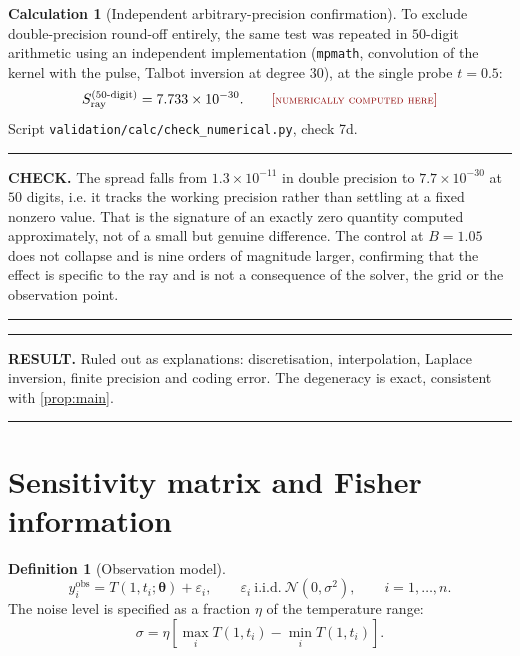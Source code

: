 \documentclass[11pt,a4paper]{article}
\theoremstyle{definition}
\newtheorem{definitionx}{Definition}[section]
\newtheorem{calculationx}{Calculation}[section]
\newenvironment{checkbox}%
  {\par\medskip\noindent\begin{minipage}{\linewidth}%
   \rule{\linewidth}{0.4pt}\par\noindent\textbf{CHECK.}\enspace}%
  {\par\rule{\linewidth}{0.4pt}\end{minipage}\par\medskip}
\newenvironment{resultbox}%
  {\par\medskip\noindent\begin{minipage}{\linewidth}%
   \rule{\linewidth}{1.0pt}\par\noindent\textbf{RESULT.}\enspace}%
  {\par\rule{\linewidth}{1.0pt}\end{minipage}\par\medskip}
\newcommand{\NUM}{\textcolor{red!55!black}{\footnotesize[\textsc{numerically computed here}]}}
\newcommand{\Bnum}{B}
\begin{document}
\begin{calculationx}[Independent arbitrary-precision confirmation]
\label{calc:degen-mp}
To exclude double-precision round-off entirely, the same test was repeated in
$50$-digit arithmetic using an independent implementation
(\texttt{mpmath}, convolution of the kernel with the pulse, Talbot inversion at
degree $30$), at the single probe $t=0.5$:
\begin{equation}
  S^{(50\text{-digit})}_{\text{ray}} = 7.733\times10^{-30} . \qquad\NUM
  \label{eq:S-mp}
\end{equation}
Script \texttt{validation/calc/check\_numerical.py}, check 7d.
\end{calculationx}

\begin{checkbox}
The spread falls from $1.3\times10^{-11}$ in double precision to
$7.7\times10^{-30}$ at $50$ digits, i.e. it tracks the working precision rather
than settling at a fixed nonzero value. That is the signature of an exactly
zero quantity computed approximately, not of a small but genuine difference.
The control at $\Bnum=1.05$ does not collapse and is nine orders of magnitude
larger, confirming that the effect is specific to the ray and is not a
consequence of the solver, the grid or the observation point.
\end{checkbox}

\begin{resultbox}
Ruled out as explanations: discretisation, interpolation, Laplace inversion,
finite precision and coding error. The degeneracy is exact, consistent with
\cref{prop:main}.
\end{resultbox}

\section{Sensitivity matrix and Fisher information}
\label{sec:fisher}

\begin{definitionx}[Observation model]
\label{def:obsmodel}
\begin{equation}
  y_{i}^{\text{obs}} = T(1,t_{i};\bm{\theta}) + \varepsilon_{i} ,
  \qquad
  \varepsilon_{i}\ \text{i.i.d.}\ \mathcal{N}(0,\sigma^{2}),
  \qquad i=1,\dots,n .
  \label{eq:obsmodel}
\end{equation}
The noise level is specified as a fraction $\eta$ of the temperature range:
\begin{equation}
  \sigma = \eta\left[\max_{i}T(1,t_{i}) - \min_{i}T(1,t_{i})\right] .
  \label{eq:sigma-def}
\end{equation}
\end{definitionx}
\end{document}
